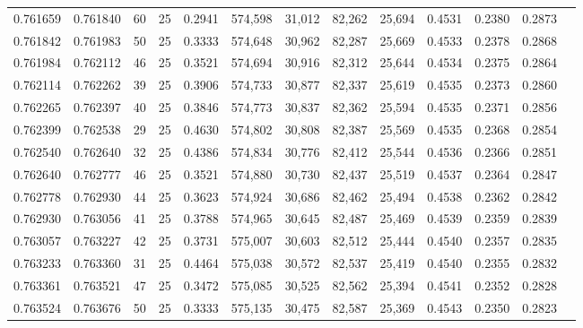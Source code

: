 \begin{tabular}{rrrrrrrrrrrrr}
0.761659 & 0.761840 &    60 &  25 &                                     0.2941 & 574,598 &  31,012 &  82,262 &  25,694 & 0.4531 & 0.2380 & 0.2873 \\
0.761842 & 0.761983 &    50 &  25 &                                     0.3333 & 574,648 &  30,962 &  82,287 &  25,669 & 0.4533 & 0.2378 & 0.2868 \\
0.761984 & 0.762112 &    46 &  25 &                                     0.3521 & 574,694 &  30,916 &  82,312 &  25,644 & 0.4534 & 0.2375 & 0.2864 \\
0.762114 & 0.762262 &    39 &  25 &                                     0.3906 & 574,733 &  30,877 &  82,337 &  25,619 & 0.4535 & 0.2373 & 0.2860 \\
0.762265 & 0.762397 &    40 &  25 &                                     0.3846 & 574,773 &  30,837 &  82,362 &  25,594 & 0.4535 & 0.2371 & 0.2856 \\
0.762399 & 0.762538 &    29 &  25 &                                     0.4630 & 574,802 &  30,808 &  82,387 &  25,569 & 0.4535 & 0.2368 & 0.2854 \\
0.762540 & 0.762640 &    32 &  25 &                                     0.4386 & 574,834 &  30,776 &  82,412 &  25,544 & 0.4536 & 0.2366 & 0.2851 \\
0.762640 & 0.762777 &    46 &  25 &                                     0.3521 & 574,880 &  30,730 &  82,437 &  25,519 & 0.4537 & 0.2364 & 0.2847 \\
0.762778 & 0.762930 &    44 &  25 &                                     0.3623 & 574,924 &  30,686 &  82,462 &  25,494 & 0.4538 & 0.2362 & 0.2842 \\
0.762930 & 0.763056 &    41 &  25 &                                     0.3788 & 574,965 &  30,645 &  82,487 &  25,469 & 0.4539 & 0.2359 & 0.2839 \\
0.763057 & 0.763227 &    42 &  25 &                                     0.3731 & 575,007 &  30,603 &  82,512 &  25,444 & 0.4540 & 0.2357 & 0.2835 \\
0.763233 & 0.763360 &    31 &  25 &                                     0.4464 & 575,038 &  30,572 &  82,537 &  25,419 & 0.4540 & 0.2355 & 0.2832 \\
0.763361 & 0.763521 &    47 &  25 &                                     0.3472 & 575,085 &  30,525 &  82,562 &  25,394 & 0.4541 & 0.2352 & 0.2828 \\
0.763524 & 0.763676 &    50 &  25 &                                     0.3333 & 575,135 &  30,475 &  82,587 &  25,369 & 0.4543 & 0.2350 & 0.2823 \\

\end{tabular}
